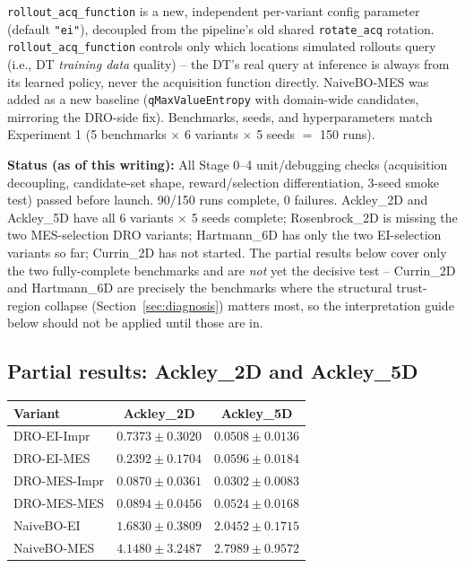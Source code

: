 \documentclass[11pt]{article}
\begin{document}
\texttt{rollout\_acq\_function} is a new, independent per-variant config
parameter (default \texttt{"ei"}), decoupled from the pipeline's old shared
\texttt{rotate\_acq} rotation. \texttt{rollout\_acq\_function} controls only
which locations simulated rollouts query (i.e., DT \emph{training data}
quality) -- the DT's real query at inference is always from its learned
policy, never the acquisition function directly. NaiveBO-MES was added as a new
baseline (\texttt{qMaxValueEntropy} with domain-wide candidates, mirroring the
DRO-side fix). Benchmarks, seeds, and hyperparameters match Experiment 1
(5 benchmarks $\times$ 6 variants $\times$ 5 seeds $=$ 150 runs).

\begin{warnbox}
\textbf{Status (as of this writing):} All Stage 0--4 unit/debugging checks
(acquisition decoupling, candidate-set shape, reward/selection differentiation,
3-seed smoke test) passed before launch. 90/150 runs complete, 0 failures.
Ackley\_2D and Ackley\_5D have all 6 variants $\times$ 5 seeds complete;
Rosenbrock\_2D is missing the two MES-selection DRO variants; Hartmann\_6D has
only the two EI-selection variants so far; Currin\_2D has not started. The
partial results below cover only the two fully-complete benchmarks and are
\emph{not} yet the decisive test -- Currin\_2D and Hartmann\_6D are precisely
the benchmarks where the structural trust-region collapse
(Section~\ref{sec:diagnosis}) matters most, so the interpretation guide below
should not be applied until those are in.
\end{warnbox}

\subsection{Partial results: Ackley\_2D and Ackley\_5D}

\begin{center}
\begin{tabular}{lcc}
\toprule
\textbf{Variant} & \textbf{Ackley\_2D} & \textbf{Ackley\_5D} \\
\midrule
DRO-EI-Impr   & $0.7373 \pm 0.3020$ & $0.0508 \pm 0.0136$ \\
DRO-EI-MES    & $0.2392 \pm 0.1704$ & $0.0596 \pm 0.0184$ \\
DRO-MES-Impr  & $\mathbf{0.0870 \pm 0.0361}$ & $\mathbf{0.0302 \pm 0.0083}$ \\
DRO-MES-MES   & $0.0894 \pm 0.0456$ & $0.0524 \pm 0.0168$ \\
NaiveBO-EI    & $1.6830 \pm 0.3809$ & $2.0452 \pm 0.1715$ \\
NaiveBO-MES   & $4.1480 \pm 3.2487$ & $2.7989 \pm 0.9572$ \\
\bottomrule
\end{tabular}
\end{center}
\end{document}
